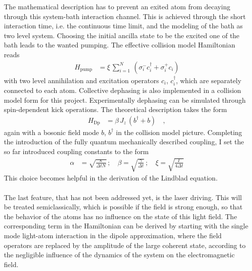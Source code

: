 The mathematical description has to prevent an exited atom from decaying through this system-bath interaction channel. This is achieved through the short interaction time, i.e. the continuous time limit, and the modeling of the bath as two level system. Choosing the initial ancilla state to be the excited one of the bath leads to the wanted pumping. The effective collision model Hamiltonian reads 
\begin{align*}
    H_\text{pump}&=\xi\,\sum_{i=1}^N\,(\sigma_i^-c_i^\dagger+\sigma_i^+c_i)
\end{align*}
with two level annihilation and excitation operators $c_i$, $c_i^\dagger$, which are separately connected to each atom. Collective dephasing is also implemented in a collision model form for this project. %
Experimentally dephasing can be simulated through spin-dependent kick operations\cite{sun_quantum_2024}. The theoretical description takes the form %
\begin{align*}
    H_\text{Dp}&=\beta\,J_z\,(b^\dagger+b)\quad,
\end{align*}
again with a bosonic field mode $b$, $b^\dagger$ in the collision model picture. Completing the introduction of the fully quantum mechanically described coupling, I set the so far introduced coupling constants to the form
\begin{align}
    \alpha&=\sqrt{\frac{\kappa}{\Delta tN}}\,;\quad \beta=\sqrt{\frac{\gamma}{\Delta t}}\,;\quad \xi=\sqrt{\frac{\Gamma}{4\Delta t}}
\end{align}
This choice becomes helpful in the derivation of the Lindblad equation.\\\\
The last feature, that has not been addressed yet, is the laser driving. This will be treated semiclassically, which is possible if the field is strong enough, so that the behavior of the atoms has no influence on the state of this light field. The corresponding term in the Hamiltonian can be derived by starting with the single mode light-atom interaction in the dipole approximation, where the field operators are replaced by the amplitude of the large coherent state, according to the negligible influence of the dynamics of the system on the electromagnetic field. 
